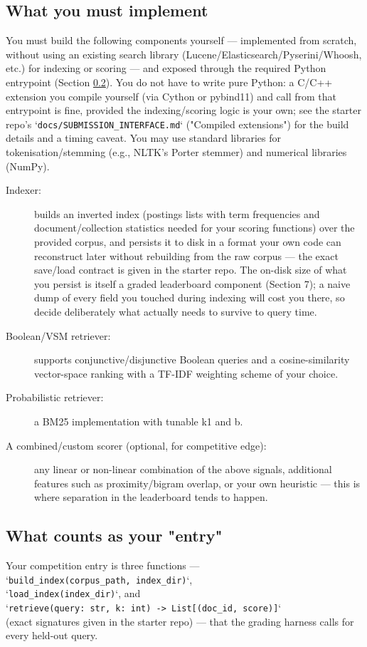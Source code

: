 \documentclass[10pt]{article}
\begin{document}
\subsection{What you must implement}
You must build the following components yourself — implemented from scratch, without using an existing search library (Lucene/Elasticsearch/Pyserini/Whoosh, etc.) for indexing or scoring — and exposed through the required Python entrypoint (Section \ref{subsec:entry}). You do not have to write pure Python: a C/C++ extension you compile yourself (via Cython or pybind11) and call from that entrypoint is fine, provided the indexing/scoring logic is your own; see the starter repo's `\texttt{docs/SUBMISSION\_INTERFACE.md}` ("Compiled extensions") for the build details and a timing caveat. You may use standard libraries for tokenisation/stemming (e.g., NLTK's Porter stemmer) and numerical libraries (NumPy).
\begin{description}
	
\item[Indexer:] builds an inverted index (postings lists with term frequencies and document/collection statistics needed for your scoring functions) over the provided corpus, and persists it to disk in a format your own code can reconstruct later without rebuilding from the raw corpus — the exact save/load contract is given in the starter repo. The on-disk size of what you persist is itself a graded leaderboard component (Section 7); a naive dump of every field you touched during indexing will cost you there, so decide deliberately what actually needs to survive to query time.
\item [Boolean/VSM retriever:] supports conjunctive/disjunctive Boolean queries and a cosine-similarity vector-space ranking with a TF-IDF weighting scheme of your choice.
\item [Probabilistic retriever:] a BM25 implementation with tunable k1 and b.
\item [A combined/custom scorer (optional, for competitive edge):] any linear or non-linear combination of the above signals, additional features such as proximity/bigram overlap, or your own heuristic — this is where separation in the leaderboard tends to happen.
\end{description}

\subsection{What counts as your "entry"}
\label{subsec:entry}
Your competition entry is three functions — \\`\texttt{build\_index(corpus\_path, index\_dir)}`,\\ `\texttt{load\_index(index\_dir)}`, and \\ `\texttt{retrieve(query: str, k: int) -> List[(doc\_id, score)]}` \\(exact signatures given in the starter repo) — that the grading harness calls for every held-out query. 
\end{document}
